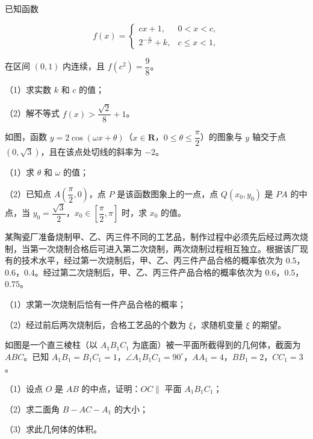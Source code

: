 \begin{question}
已知函数

\nopagebreak[4]
\[f(x)=\begin{cases}cx+1,&0<x<c,\\ 2^{-\frac{x}{c^2}}+k,&c\leqslant x<1,\end{cases}\]

在区间 $(0,1)$ 内连续，且 $f(c^2)=\dfrac98$。

（1）求实数 $k$ 和 $c$ 的值；

（2）解不等式 $f(x)>\dfrac{\sqrt2}{8}+1$。

\Needspace{0.4\textheight}
\end{question}
\begin{question}
如图，函数 $y=2\cos(\omega x+\theta)$（$x\in\mathbf R$，$0\leqslant\theta\leqslant\dfrac{\pi}{2}$）的图象与 $y$ 轴交于点 $(0,\sqrt3)$，且在该点处切线的斜率为 $-2$。

（1）求 $\theta$ 和 $\omega$ 的值；

（2）已知点 $A\left(\dfrac{\pi}{2},0\right)$，点 $P$ 是该函数图象上的一点，点 $Q(x_0,y_0)$ 是 $PA$ 的中点，当 $y_0=\dfrac{\sqrt3}{2}$，$x_0\in\left[\dfrac{\pi}{2},\pi\right]$ 时，求 $x_0$ 的值。
\nopagebreak[4]
\begin{center}\end{center}
\nopagebreak[4]
\end{question}
\begin{question}
某陶瓷厂准备烧制甲、乙、丙三件不同的工艺品，制作过程中必须先后经过两次烧制，当第一次烧制合格后可进入第二次烧制，两次烧制过程相互独立。根据该厂现有的技术水平，经过第一次烧制后，甲、乙、丙三件产品合格的概率依次为 $0.5$，$0.6$，$0.4$。经过第二次烧制后，甲、乙、丙三件产品合格的概率依次为 $0.6$，$0.5$，$0.75$。

（1）求第一次烧制后恰有一件产品合格的概率；

（2）经过前后两次烧制后，合格工艺品的个数为 $\xi$，求随机变量 $\xi$ 的期望。

\Needspace{0.4\textheight}
\end{question}
\begin{question}
如图是一个直三棱柱（以 $A_1B_1C_1$ 为底面）被一平面所截得到的几何体，截面为 $ABC$。已知 $A_1B_1=B_1C_1=1$，$\angle A_1B_1C_1=90^\circ$，$AA_1=4$，$BB_1=2$，$CC_1=3$。

（1）设点 $O$ 是 $AB$ 的中点，证明：$OC\parallel$ 平面 $A_1B_1C_1$；

（2）求二面角 $B-AC-A_1$ 的大小；

（3）求此几何体的体积。
\nopagebreak[4]
\begin{center}\end{center}
\nopagebreak[4]
\Needspace{0.4\textheight}
\end{question}
